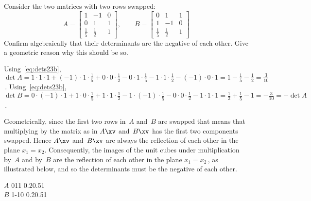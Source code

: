 \begin{example} \label{eg:detswap}
Consider the two matrices with two rows swapped:
\begin{equation*}
A=\begin{bmatrix} 1&-1&0
\\0&1&1
\\\frac15&\frac12&1 \end{bmatrix},\qquad
B=\begin{bmatrix} 0&1&1
\\1&-1&0
\\\frac15&\frac12&1 \end{bmatrix}
\end{equation*}
Confirm algebraically that their determinants are the negative of each other.
Give a geometric reason why this should be so.
\begin{solution} 
Using~\eqref{eq:dets23b}, \(\det A 
=1\cdot1\cdot1 +(-1)\cdot1\cdot\frac15 +0\cdot0\cdot\frac12
-0\cdot1\cdot\frac15 -1\cdot1\cdot\frac12 -(-1)\cdot0\cdot1 
=1-\frac15-\frac12=\frac3{10}\)\,.  
Using~\eqref{eq:dets23b}, \(\det B =0\cdot(-1)\cdot1 
+1\cdot0\cdot\frac15 
+1\cdot1\cdot\frac12
-1\cdot(-1)\cdot\frac15 
-0\cdot0\cdot\frac12 
-1\cdot1\cdot1 
=\frac12+\frac15-1=-\frac3{10}=-\det A\)\,.  

Geometrically, since the first two rows in~\(A\) and~\(B\) are swapped that means that multiplying by the matrix as in \(A\xv\) and~\(B\xv\) has the first two components swapped.
Hence \(A\xv\) and~\(B\xv\) are always the reflection of each other in the plane \(x_1=x_2\).
Consequently, the images of the unit cubes under multiplication by~\(A\) and by~\(B\) are the reflection of each other in the plane \(x_1=x_2\)\,, as illustrated below,
and so the determinants must be the negative of each other.
\begin{center}
\def\unithouseviews{25,20}
\(A\)\quad{}
011
{0.2}{0.5}1
\\
\(B\)\quad{}
1{-1}{0}
{0.2}{0.5}1
\end{center}
\end{solution}
\end{example}




